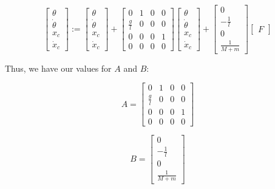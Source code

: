 \documentclass[11pt]{article}
\begin{document}
\begin{equation} \label{state_representation}
    \displaystyle
    \begin{bmatrix}
        \theta \\
        \dot \theta \\
        x _c \\
        \dot x _c
    \end{bmatrix}
    := \begin{bmatrix}
        \theta \\
        \dot \theta \\
        x _c \\
        \dot x _c
    \end{bmatrix}
    + \begin{bmatrix}
        0 & 1 & 0 & 0 \\
        \frac{g}{l} & 0 & 0 & 0 \\
        0 & 0 & 0 & 1 \\
        0 & 0 & 0 & 0
    \end{bmatrix}
    \begin{bmatrix}
        \theta \\
        \dot \theta \\
        x _c \\
        \dot x _c
    \end{bmatrix}
    + \begin{bmatrix}
        0 \\
        - \frac{1}{l} \\
        0 \\
        \frac{1}{M + m}
    \end{bmatrix}
    \begin{bmatrix}
        F
    \end{bmatrix}
\end{equation}

Thus, we have our values for $A$ and $B$:

\begin{equation}
    \displaystyle A = \begin{bmatrix}
        0 & 1 & 0 & 0 \\
        \frac{g}{l} & 0 & 0 & 0 \\
        0 & 0 & 0 & 1 \\
        0 & 0 & 0 & 0
    \end{bmatrix}
\end{equation}

\begin{equation}
    \displaystyle B = \begin{bmatrix}
        0 \\
        - \frac{1}{l} \\
        0 \\
        \frac{1}{M + m}
    \end{bmatrix}
\end{equation}
\end{document}
